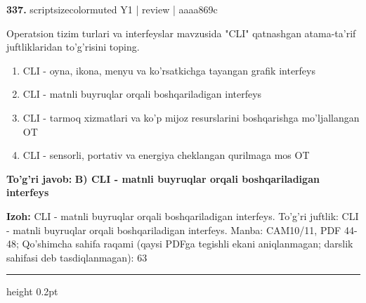 \documentclass[10pt,a4paper]{article}
\begin{document}
{\bfseries\sffamily\color{ink} 337.} {scriptsizecolor{muted} Y1 | review | aaaa869c}
\par
Operatsion tizim turlari va interfeyslar mavzusida "CLI" qatnashgan atama-ta'rif juftliklaridan to'g'risini toping.
\begin{enumerate}[label=\Alph*),leftmargin=9mm]
\item CLI - oyna, ikona, menyu va ko'rsatkichga tayangan grafik interfeys
\item CLI - matnli buyruqlar orqali boshqariladigan interfeys
\item CLI - tarmoq xizmatlari va ko'p mijoz resurslarini boshqarishga mo'ljallangan OT
\item CLI - sensorli, portativ va energiya cheklangan qurilmaga mos OT
\end{enumerate}
\begin{tcolorbox}[enhanced,breakable,colback=teal!4,colframe=teal!60!black,boxrule=0.45pt,arc=1.2mm,left=2.7mm,right=2.7mm,top=1.8mm,bottom=1.8mm,before skip=2mm,after skip=2mm]
{\bfseries\sffamily\color{teal}To'g'ri javob:} \textbf{B) CLI - matnli buyruqlar orqali boshqariladigan interfeys}
\par\smallskip
{\bfseries Izoh:} CLI - matnli buyruqlar orqali boshqariladigan interfeys. To'g'ri juftlik: CLI - matnli buyruqlar orqali boshqariladigan interfeys. Manba: CAM10/11, PDF 44-48; Qo'shimcha sahifa raqami (qaysi PDFga tegishli ekani aniqlanmagan; darslik sahifasi deb tasdiqlanmagan): 63
\end{tcolorbox}
\vspace{2mm}\hrule height 0.2pt\vspace{3mm}
\end{document}
